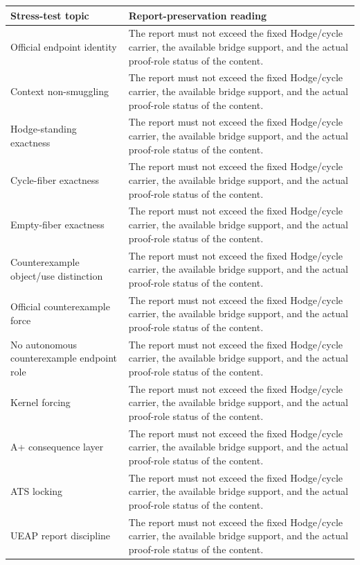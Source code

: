 \documentclass[11pt]{article}
\begin{document}
{\scriptsize
\begin{longtable}{p{}p{}}
\toprule
Stress-test topic & Report-preservation reading\\
\midrule
\endhead
Official endpoint identity & The report must not exceed the fixed Hodge/cycle carrier, the available bridge support, and the actual proof-role status of the content.\\
Context non-smuggling & The report must not exceed the fixed Hodge/cycle carrier, the available bridge support, and the actual proof-role status of the content.\\
Hodge-standing exactness & The report must not exceed the fixed Hodge/cycle carrier, the available bridge support, and the actual proof-role status of the content.\\
Cycle-fiber exactness & The report must not exceed the fixed Hodge/cycle carrier, the available bridge support, and the actual proof-role status of the content.\\
Empty-fiber exactness & The report must not exceed the fixed Hodge/cycle carrier, the available bridge support, and the actual proof-role status of the content.\\
Counterexample object/use distinction & The report must not exceed the fixed Hodge/cycle carrier, the available bridge support, and the actual proof-role status of the content.\\
Official counterexample force & The report must not exceed the fixed Hodge/cycle carrier, the available bridge support, and the actual proof-role status of the content.\\
No autonomous counterexample endpoint role & The report must not exceed the fixed Hodge/cycle carrier, the available bridge support, and the actual proof-role status of the content.\\
Kernel forcing & The report must not exceed the fixed Hodge/cycle carrier, the available bridge support, and the actual proof-role status of the content.\\
A+ consequence layer & The report must not exceed the fixed Hodge/cycle carrier, the available bridge support, and the actual proof-role status of the content.\\
ATS locking & The report must not exceed the fixed Hodge/cycle carrier, the available bridge support, and the actual proof-role status of the content.\\
UEAP report discipline & The report must not exceed the fixed Hodge/cycle carrier, the available bridge support, and the actual proof-role status of the content.\\

\end{longtable}}
\end{document}
